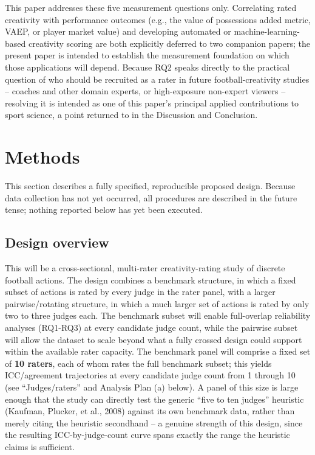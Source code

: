 \documentclass[
  12pt,
]{article}
\begin{document}
This paper addresses these five measurement questions only. Correlating
rated creativity with performance outcomes (e.g., the value of
possessions added metric, VAEP, or player market value) and developing
automated or machine-learning-based creativity scoring are both
explicitly deferred to two companion papers; the present paper is
intended to establish the measurement foundation on which those
applications will depend. Because RQ2 speaks directly to the practical
question of who should be recruited as a rater in future
football-creativity studies -- coaches and other domain experts, or
high-exposure non-expert viewers -- resolving it is intended as one of
this paper's principal applied contributions to sport science, a point
returned to in the Discussion and Conclusion.

\section{Methods}\label{methods}

This section describes a fully specified, reproducible proposed design.
Because data collection has not yet occurred, all procedures are
described in the future tense; nothing reported below has yet been
executed.

\subsection{Design overview}\label{design-overview}

This will be a cross-sectional, multi-rater creativity-rating study of
discrete football actions. The design combines a benchmark structure, in
which a fixed subset of actions is rated by every judge in the rater
panel, with a larger pairwise/rotating structure, in which a much larger
set of actions is rated by only two to three judges each. The benchmark
subset will enable full-overlap reliability analyses (RQ1-RQ3) at every
candidate judge count, while the pairwise subset will allow the dataset
to scale beyond what a fully crossed design could support within the
available rater capacity. The benchmark panel will comprise a fixed set
of \textbf{10 raters}, each of whom rates the full benchmark subset;
this yields ICC/agreement trajectories at every candidate judge count
from 1 through 10 (see ``Judges/raters'' and Analysis Plan (a) below). A
panel of this size is large enough that the study can directly test the
generic ``five to ten judges'' heuristic (Kaufman, Plucker, et al.,
2008) against its own benchmark data, rather than merely citing the
heuristic secondhand -- a genuine strength of this design, since the
resulting ICC-by-judge-count curve spans exactly the range the heuristic
claims is sufficient.
\end{document}
